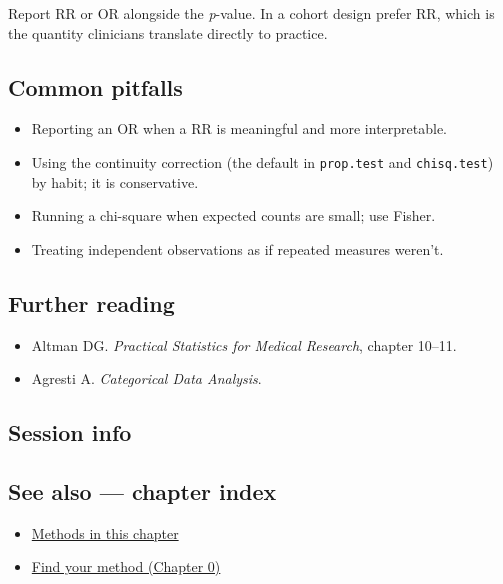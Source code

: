\documentclass[
]{article}
\newenvironment{Shaded}{\begin{snugshade}}{\end{snugshade}}
\providecommand{\tightlist}{%
  \setlength{\itemsep}{0pt}\setlength{\parskip}{0pt}}
\begin{document}
Report RR or OR alongside the \emph{p}-value. In a cohort design prefer
RR, which is the quantity clinicians translate directly to practice.

\subsection{Common pitfalls}\label{common-pitfalls}

\begin{itemize}
\tightlist
\item
  Reporting an OR when a RR is meaningful and more interpretable.
\item
  Using the continuity correction (the default in \texttt{prop.test} and
  \texttt{chisq.test}) by habit; it is conservative.
\item
  Running a chi-square when expected counts are small; use Fisher.
\item
  Treating independent observations as if repeated measures weren't.
\end{itemize}

\subsection{Further reading}\label{further-reading}

\begin{itemize}
\tightlist
\item
  Altman DG. \emph{Practical Statistics for Medical Research}, chapter
  10--11.
\item
  Agresti A. \emph{Categorical Data Analysis}.
\end{itemize}

\subsection{Session info}\label{session-info}

\begin{Shaded}
\begin{Highlighting}[]

\end{Highlighting}
\end{Shaded}

\subsection{See also --- chapter index}\label{see-also-chapter-index}

\begin{itemize}
\tightlist
\item
  \href{../index.Rmd}{Methods in this chapter}
\item
  \href{../../../ch00-find-your-method.Rmd}{Find your method (Chapter
  0)}
\end{itemize}
\end{document}

